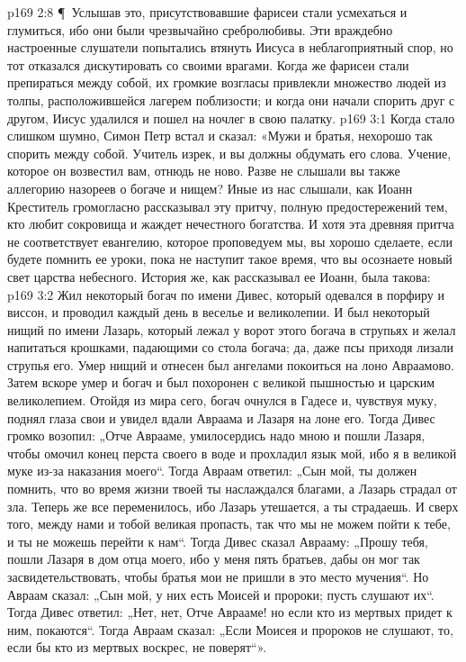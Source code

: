 \vs p169 2:8 \P\ Услышав это, присутствовавшие фарисеи стали усмехаться и глумиться, ибо они были чрезвычайно сребролюбивы. Эти враждебно настроенные слушатели попытались втянуть Иисуса в неблагоприятный спор, но тот отказался дискутировать со своими врагами. Когда же фарисеи стали препираться между собой, их громкие возгласы привлекли множество людей из толпы, расположившейся лагерем поблизости; и когда они начали спорить друг с другом, Иисус удалился и пошел на ночлег в свою палатку.
\vs p169 3:1 Когда стало слишком шумно, Симон Петр встал и сказал: «Мужи и братья, нехорошо так спорить между собой. Учитель изрек, и вы должны обдумать его слова. Учение, которое он возвестил вам, отнюдь не ново. Разве не слышали вы также аллегорию назореев о богаче и нищем? Иные из нас слышали, как Иоанн Креститель громогласно рассказывал эту притчу, полную предостережений тем, кто любит сокровища и жаждет нечестного богатства. И хотя эта древняя притча не соответствует евангелию, которое проповедуем мы, вы хорошо сделаете, если будете помнить ее уроки, пока не наступит такое время, что вы осознаете новый свет царства небесного. История же, как рассказывал ее Иоанн, была такова:
\vs p169 3:2 Жил некоторый богач по имени Дивес, который одевался в порфиру и виссон, и проводил каждый день в веселье и великолепии. И был некоторый нищий по имени Лазарь, который лежал у ворот этого богача в струпьях и желал напитаться крошками, падающими со стола богача; да, даже псы приходя лизали струпья его. Умер нищий и отнесен был ангелами покоиться на лоно Авраамово. Затем вскоре умер и богач и был похоронен с великой пышностью и царским великолепием. Отойдя из мира сего, богач очнулся в Гадесе и, чувствуя муку, поднял глаза свои и увидел вдали Авраама и Лазаря на лоне его. Тогда Дивес громко возопил: „Отче Аврааме, умилосердись надо мною и пошли Лазаря, чтобы омочил конец перста своего в воде и прохладил язык мой, ибо я в великой муке из\hyp{}за наказания моего“. Тогда Авраам ответил: „Сын мой, ты должен помнить, что во время жизни твоей ты наслаждался благами, а Лазарь страдал от зла. Теперь же все переменилось, ибо Лазарь утешается, а ты страдаешь. И сверх того, между нами и тобой великая пропасть, так что мы не можем пойти к тебе, и ты не можешь перейти к нам“. Тогда Дивес сказал Аврааму: „Прошу тебя, пошли Лазаря в дом отца моего, ибо у меня пять братьев, дабы он мог так засвидетельствовать, чтобы братья мои не пришли в это место мучения“. Но Авраам сказал: „Сын мой, у них есть Моисей и пророки; пусть слушают их“. Тогда Дивес ответил: „Нет, нет, Отче Аврааме! но если кто из мертвых придет к ним, покаются“. Тогда Авраам сказал: „Если Моисея и пророков не слушают, то, если бы кто из мертвых воскрес, не поверят“».
